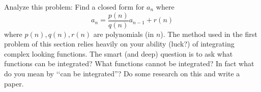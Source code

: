 Analyze this problem:
Find a closed form for $a_n$ where
\[
a_n = \frac{p(n)}{q(n)} a_{n - 1} + r(n)
\]
where $p(n), q(n), r(n)$ are polynomials (in $n$).
The method used in the first problem of this section relies
heavily on your ability (luck?) of integrating complex looking functions.
The smart (and deep) question is to ask what functions can be integrated?
What functions cannot be integrated? In fact what do you mean by
\lq\lq can be integrated''?
Do some research on this and write a paper.
